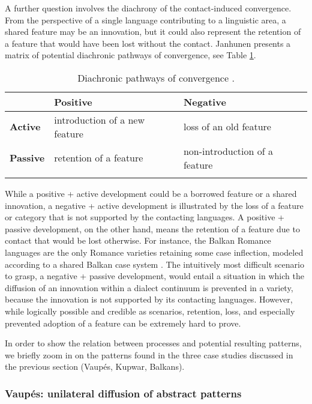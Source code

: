 \documentclass[output=paper,
modfonts
]{langscibook}
\begin{document}
A further question involves the diachrony of the contact-induced convergence. From the perspective of a single language contributing to a linguistic area, a shared feature may be an innovation, but it could also represent the retention of a feature that would have been lost without the contact. Janhunen \parencite*[117]{janhunen2005} presents a matrix of potential diachronic pathways of convergence, see Table \ref{diachronic paths}.

\begin{table}
\caption{Diachronic pathways of convergence \parencite[117]{janhunen2005}.}
\label{diachronic paths}
 \begin{tabular}{ l | l | l } 
  \lsptoprule
         & \textbf{Positive} & \textbf{Negative} \\ 
  \midrule
  \textbf{Active}  &   introduction of a new feature & loss of an old feature \\
	\midrule
  \textbf{Passive}  &  retention of a feature & non-introduction of a feature \\
  
  \lspbottomrule
 \end{tabular}
\end{table}

\noindent While a positive + active development could be a borrowed feature or a shared innovation, a negative + active development is illustrated by the loss of a feature or category that is not supported by the contacting languages. A positive + passive development, on the other hand, means the retention of a feature due to contact that would be lost otherwise. For instance, the Balkan Romance languages are the only Romance varieties retaining some case inflection, modeled according to a shared Balkan case system \parencite[107]{wahlström2015}. The intuitively most difficult scenario to grasp, a negative + passive development, would entail a situation in which the diffusion of an innovation within a dialect continuum is prevented in a variety, because the innovation is not supported by its contacting languages. However, while logically possible and credible as scenarios, retention, loss, and especially prevented adoption of a feature can be extremely hard to prove.

In order to show the relation between processes and potential resulting patterns, we briefly zoom in on the patterns found in the three case studies discussed in the previous section (Vaupés, Kupwar, Balkans).\\

\subsubsection*{Vaupés: unilateral diffusion of abstract patterns}
\end{document}
